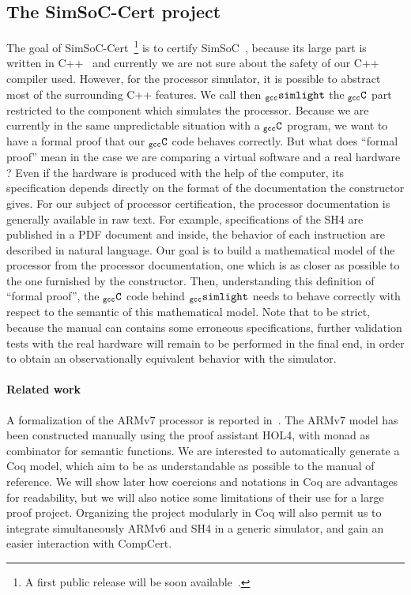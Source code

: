 \documentclass[a4paper, 11pt]{article}
\newcommand{\newrelease}{A first public release will be soon available}
\newcommand{\gccSL}{$_{\tt gcc}{\tt simlight}$\xspace}
\newcommand{\gccC}{$_{\tt gcc}{\tt C}$\xspace}
\newcommand{\simsoc}{SimSoC\xspace}
\newcommand{\SScert}{SimSoC-Cert\xspace}
\begin{document}
\subsection{The \SScert project}
The goal of \SScert~\footnote{\newrelease~\cite{urlsscert}.} is to certify \simsoc~\cite{arm}, because its large part is written in C++~\cite{ossc09} and currently we are not sure about the safety of our C++ compiler used. However, for the processor simulator, it is possible to abstract most of the surrounding C++ features. We call then \gccSL the \gccC part restricted to the component which simulates the processor. Because we are currently in the same unpredictable situation with a \gccC program, we want to have a formal proof that our \gccC code behaves correctly. But what does ``formal proof'' mean in the case we are comparing a virtual software and a real hardware ? Even if the hardware is produced with the help of the computer, its specification depends directly on the format of the documentation the constructor gives. For our subject of processor certification, the processor documentation is generally available in raw text. For example, specifications of the SH4 are published in a PDF document and inside, the behavior of each instruction are described in natural language. Our goal is to build a mathematical model of the processor from the processor documentation, one which is as closer as possible to the one furnished by the constructor. Then, understanding this definition of ``formal proof'', the \gccC code behind \gccSL needs to behave correctly with respect to the semantic of this mathematical model. Note that to be strict, because the manual can contains some erroneous specifications, further validation tests with the real hardware will remain to be performed in the final end, in order to obtain an observationally equivalent behavior with the simulator.

\paragraph{Related work}
A formalization of the ARMv7 processor is reported in~\cite{conf/itp/FoxM10}. The ARMv7 model has been constructed manually using the proof assistant HOL4, with monad as combinator for semantic functions. 
We are interested to automatically generate a Coq model, which aim to be as understandable as possible to the manual of reference. We will show later how coercions and notations in Coq are advantages for readability, but we will also notice some limitations of their use for a large proof project. Organizing the project modularly in Coq will also permit us to integrate simultaneously ARMv6 and SH4 in a generic simulator, and gain an easier interaction with CompCert.
\end{document}

